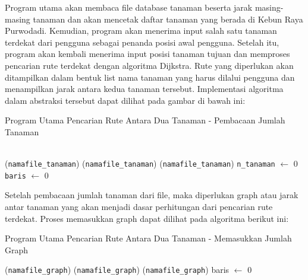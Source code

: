 \documentclass[conference]{IEEEtran}
\begin{document}
Program utama akan membaca file database tanaman beserta jarak masing-masing tanaman dan akan mencetak daftar tanaman yang berada di Kebun Raya Purwodadi.
Kemudian, program akan menerima input salah satu tanaman terdekat dari pengguna sebagai penanda posisi awal pengguna.
Setelah itu, program akan kembali menerima input posisi tanaman tujuan dan memproses pencarian rute terdekat dengan algoritma Dijkstra.
Rute yang diperlukan akan ditampilkan dalam bentuk list nama tanaman yang harus dilalui pengguna dan menampilkan jarak antara kedua tanaman tersebut.
Implementasi algoritma dalam abstraksi tersebut dapat dilihat pada gambar di bawah ini:
\begin{algorithm}
    \caption{Program Utama Pencarian Rute Antara Dua Tanaman - Pembacaan Jumlah Tanaman}
     \\
    (\texttt{namafile\_tanaman})\;
    (\texttt{namafile\_tanaman})\;
    (\texttt{namafile\_tanaman})\;
    \texttt{n\_tanaman} $\leftarrow$ 0\;
    \texttt{baris} $\leftarrow$ 0\;
\end{algorithm}

Setelah pembacaan jumlah tanaman dari file, maka diperlukan graph atau jarak antar tanaman yang akan menjadi dasar perhitungan dari pencarian rute terdekat.
Proses memasukkan graph dapat dilihat pada algoritma berikut ini:
\begin{algorithm}
    \caption{Program Utama Pencarian Rute Antara Dua Tanaman - Memasukkan Jumlah Graph}
    (\texttt{namafile\_graph})\;
    (\texttt{namafile\_graph})\;
    (\texttt{namafile\_graph})\;
    baris $\leftarrow$ 0\;
\end{algorithm}
\end{document}
